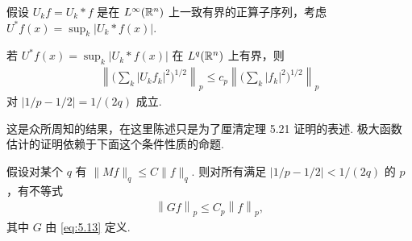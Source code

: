 假设 $U_k f = U_k * f$ 是在 $L^\infty(\mathbb{R}^n)$ 上一致有界的正算子序列，考虑 $U^* f(x) = \sup_k |U_k * f(x)|$.

\begin{lemma}\label{lem:5.26}
若 $U^* f(x) = \sup_k |U_k * f(x)|$ 在 $L^q(\mathbb{R}^n)$ 上有界，则
\begin{align*}
  \left\|\Big(\sum_{k}|U_{k}f_{k}|^{2}\Big)^{1/2}\right\|_{p}
  \leq c_{p}\left\|\Big(\sum_{k}|f_{k}|^{2}\Big)^{1/2}\right\|_{p}
\end{align*}
对 $|1/p - 1/2| = 1/(2q)$ 成立.
\end{lemma}

这是众所周知的结果，在这里陈述只是为了厘清定理 5.21 证明的表述. 极大函数估计的证明依赖于下面这个条件性质的命题.

\begin{lemma}\label{lem:5.27}
假设对某个 $q$ 有 $\|Mf\|_q \leq C\|f\|_q$. 则对所有满足 $|1/p - 1/2| < 1/(2q)$ 的 $p$，有不等式
\begin{align*}
  \left\|G f\right\|_{p}\leq C_{p}\left\|f\right\|_{p},
\end{align*}
其中 $G$ 由 \eqref{eq:5.13} 定义.
\end{lemma}

